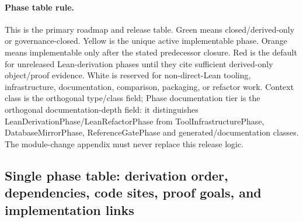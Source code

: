 \paragraph{Phase table rule.} This is the primary roadmap and release table. Green means closed/derived-only or governance-closed. Yellow is the unique active implementable phase. Orange means implementable only after the stated predecessor closure. Red is the default for unreleased Lean-derivation phases until they cite sufficient derived-only object/proof evidence. White is reserved for non-direct-Lean tooling, infrastructure, documentation, comparison, packaging, or refactor work. Context class is the orthogonal type/class field; Phase documentation tier is the orthogonal documentation-depth field: it distinguishes LeanDerivationPhase/LeanRefactorPhase from ToolInfrastructurePhase, DatabaseMirrorPhase, ReferenceGatePhase and generated/documentation classes. The module-change appendix must never replace this release logic.
\subsection*{Single phase table: derivation order, dependencies, code sites, proof goals, and implementation links}

